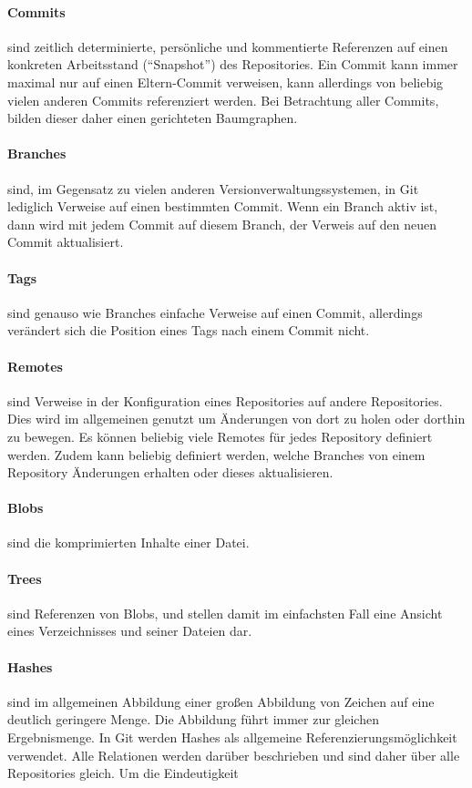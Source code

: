 \paragraph{Commits} sind zeitlich determinierte, persönliche und kommentierte Referenzen auf einen konkreten Arbeitsstand (``Snapshot'') des Repositories. Ein Commit kann immer maximal nur auf einen Eltern-Commit verweisen, kann allerdings von beliebig vielen anderen Commits referenziert werden. Bei Betrachtung aller Commits, bilden dieser daher einen gerichteten Baumgraphen.

\paragraph{Branches} sind, im Gegensatz zu vielen anderen Versionverwaltungssystemen, in Git lediglich Verweise auf einen bestimmten Commit. Wenn ein Branch aktiv ist, dann wird mit jedem Commit auf diesem Branch, der Verweis auf den neuen Commit aktualisiert.

\paragraph{Tags} sind genauso wie Branches einfache Verweise auf einen Commit, allerdings verändert sich die Position eines Tags nach einem Commit nicht.

\paragraph{Remotes} sind Verweise in der Konfiguration eines Repositories auf andere Repositories. Dies wird im allgemeinen genutzt um Änderungen von dort zu holen oder dorthin zu bewegen. Es können beliebig viele Remotes für jedes Repository definiert werden. Zudem kann beliebig definiert werden, welche Branches von einem Repository Änderungen erhalten oder dieses aktualisieren.

\paragraph{Blobs} sind die komprimierten Inhalte einer Datei.

\paragraph{Trees} sind Referenzen von Blobs, und stellen damit im einfachsten Fall eine Ansicht eines Verzeichnisses und seiner Dateien dar.

\paragraph{Hashes} sind im allgemeinen Abbildung einer großen Abbildung von Zeichen auf eine deutlich geringere Menge. Die Abbildung führt immer zur gleichen Ergebnismenge. In Git werden Hashes als allgemeine Referenzierungsmöglichkeit verwendet. Alle Relationen werden darüber beschrieben und sind daher über alle Repositories gleich. Um die Eindeutigkeit 

